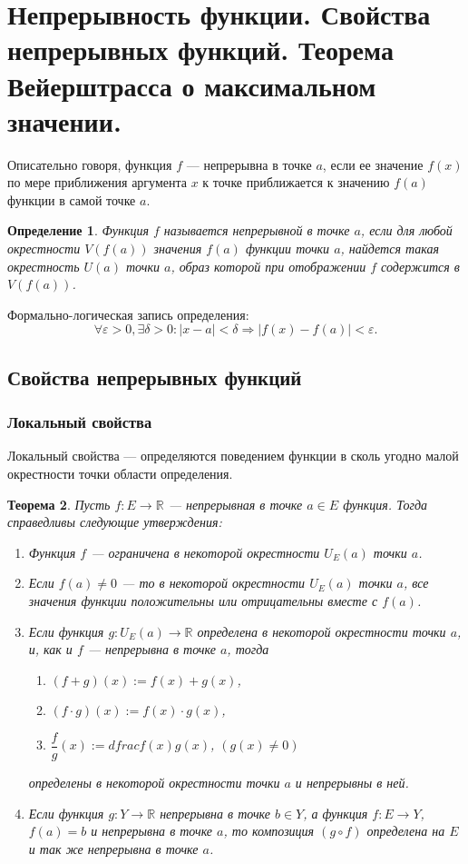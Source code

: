 \documentclass[12pt]{report}
\theoremstyle{plain}
\newtheorem{theorem}{Теорема}[chapter]
\newtheorem{definition}[theorem]{Определение}
\newcommand{\R}{\mathbb R}
\begin{document}
\section{Непрерывность функции. Свойства непрерывных функций. Теорема Вейерштрасса о максимальном значении.}

Описательно говоря, функция $f$ --- непрерывна в точке $a$, если ее значение $f(x)$ по мере приближения
аргумента $x$ к точке приближается к значению $f(a)$ функции в самой точке $a$.

\begin{definition}
Функция $f$ называется непрерывной в точке $a$, если для любой
окрестности $V(f(a))$ значения $f(a)$ функции точки $a$, найдется такая
окрестность $U(a)$ точки $a$, образ которой при отображении $f$ содержится
в $V(f(a))$.
\end{definition}

Формально-логическая запись определения:
$$
\forall \varepsilon > 0, \exists \delta > 0:
|x - a| < \delta \Rightarrow |f(x) - f(a)| < \varepsilon.
$$


\subsection{Свойства непрерывных функций}
\subsubsection{Локальный свойства}
Локальный свойства --- определяются поведением функции в сколь угодно
малой окрестности точки области определения.

\begin{theorem}
Пусть $f: E \rightarrow \R$ --- непрерывная в точке $a \in E$ функция.
Тогда справедливы следующие утверждения:
\begin{enumerate}
  \item Функция $f$ --- ограничена в некоторой окрестности $U_E(a)$ точки $a$.
  \item Если $f(a) \ne 0$ --- то в некоторой окрестности $U_E(a)$ точки $a$,
    все значения функции положительны или отрицательны вместе с $f(a)$.
  \item Если функция $g: U_E(a) \rightarrow \R$ определена в некоторой окрестности
    точки $a$, и, как и $f$ --- непрерывна в точке $a$, тогда
    \begin{enumerate}
      \item $(f + g)(x) := f(x) + g(x)$,
      \item $(f \cdot g)(x) := f(x) \cdot g(x)$,
      \item $\dfrac{f}{g}(x) := dfrac{f(x)}{g(x)}$, $(g(x) \ne 0)$
    \end{enumerate}
    определены в некоторой окрестности точки $a$ и непрерывны в ней.
  \item Если функция $g: Y \rightarrow \R$ непрерывна в точке $b \in Y$,
    а функция $f: E \rightarrow Y$, $f(a) = b$ и непрерывна в точке $a$,
    то композиция $(g \circ f)$ определена на $E$ и так же непрерывна в точке $a$.
\end{enumerate}
\end{theorem}
\end{document}
